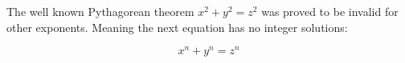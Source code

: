\documentclass{article}
\begin{document}


The well known Pythagorean theorem \(x^2 + y^2 = z^2\) was 
proved to be invalid for other exponents. 
Meaning the next equation has no integer solutions:

\[ x^n + y^n = z^n \]
\end{document}
